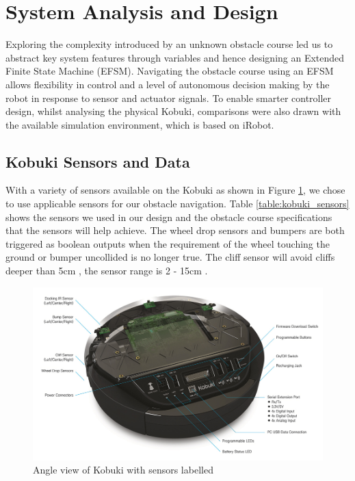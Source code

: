 \documentclass[11pt]{article}
\begin{document}
\section{System Analysis and Design}\label{sec:system}
\vspace{-0.2cm} Exploring the complexity introduced by an unknown obstacle course led us to abstract key system features through variables and hence designing an Extended Finite State Machine (EFSM). Navigating the obstacle course using an EFSM allows flexibility in control and a level of autonomous decision making by the robot in response to sensor and actuator signals. To enable smarter controller design, whilst analysing the physical Kobuki, comparisons were also drawn with the available simulation environment, which is based on iRobot.

\subsection{Kobuki Sensors and Data}
\vspace{-0.2cm} With a variety of sensors available on the Kobuki as shown in Figure \ref{fig:kobuki_sensors}, we chose to use applicable sensors for our obstacle navigation. Table \ref{table:kobuki_sensors} shows the sensors we used in our design and the obstacle course specifications that the sensors will help achieve. The wheel drop sensors and bumpers are both triggered as boolean outputs when the requirement of the wheel touching the ground or bumper uncollided is no longer true. The cliff sensor will avoid cliffs deeper than 5cm \cite{kobuki_datasheet}, the sensor range is 2 - 15cm \cite{kobukisensors}.
\begin{figure}[H]
    \centering
    \includegraphics[width=12cm]{kobuki_spec.jpg}
    \caption{Angle view of Kobuki with sensors labelled \cite{kobuki_spec_pic}}
    \label{fig:kobuki_sensors}
\end{figure}
\end{document}
